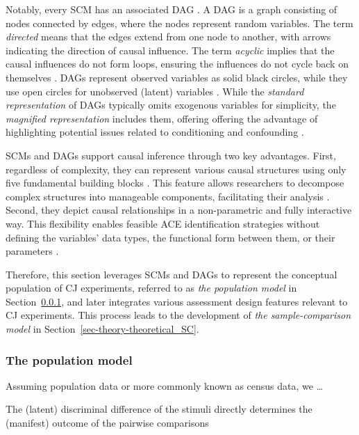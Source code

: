 \documentclass[
  authoryear,
  review,
  1p]{elsarticle}
\begin{document}
Notably, every SCM has an associated DAG
\citep{Pearl_et_al_2016, Cinelli_et_al_2020}. A DAG is a graph
consisting of nodes connected by edges, where the nodes represent random
variables. The term \emph{directed} means that the edges extend from one
node to another, with arrows indicating the direction of causal
influence. The term \emph{acyclic} implies that the causal influences do
not form loops, ensuring the influences do not cycle back on themselves
\citep{McElreath_2020}. DAGs represent observed variables as solid black
circles, while they use open circles for unobserved (latent) variables
\citep{Morgan_et_al_2014}. While the \emph{standard representation} of
DAGs typically omits exogenous variables for simplicity, the
\emph{magnified representation} includes them, offering offering the
advantage of highlighting potential issues related to conditioning and
confounding \citep{Cinelli_et_al_2020}.

SCMs and DAGs support causal inference through two key advantages.
First, regardless of complexity, they can represent various causal
structures using only five fundamental building blocks
\citep{Neal_2020, McElreath_2020}. This feature allows researchers to
decompose complex structures into manageable components, facilitating
their analysis \citep{McElreath_2020}. Second, they depict causal
relationships in a non-parametric and fully interactive way. This
flexibility enables feasible ACE identification strategies without
defining the variables' data types, the functional form between them, or
their parameters \citep[pp.~35]{Pearl_et_al_2016}.

Therefore, this section leverages SCMs and DAGs to represent the
conceptual population of CJ experiments, referred to as \emph{the
population model} in Section~\ref{sec-theory-theoretical_P}, and later
integrates various assessment design features relevant to CJ
experiments. This process leads to the development of \emph{the
sample-comparison model} in Section~\ref{sec-theory-theoretical_SC}.

\subsubsection{The population model}\label{sec-theory-theoretical_P}

Assuming population data or more commonly known as census data, we
\ldots{}

The (latent) discriminal difference of the stimuli directly determines
the (manifest) outcome of the pairwise comparisons
\end{document}
